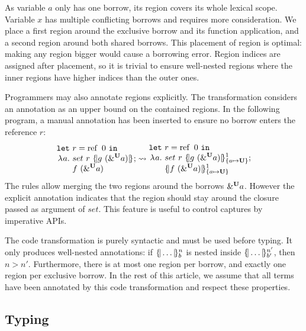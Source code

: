 %
As variable $a$ only has one borrow, its region covers its whole lexical scope.
Variable $x$ has multiple conflicting borrows and requires more consideration.
We place a first
region around the exclusive borrow and its function application,
and a second region around both shared borrows. This placement of region
is optimal: making any region bigger would cause a borrowing
error.
Region indices are assigned after placement, so it is trivial to
ensure well-nested regions where the inner regions have
higher indices than the outer ones.

Programmers may also annotate regions explicitly.
The transformation considers an annotation as an
upper bound on the contained regions.
In the following program, a manual annotation has been inserted to ensure
no borrow enters the reference $r$:
%
\[
  \setlength{\jot}{-1pt}
  \RannotT{
\begin{aligned}
  \letin{&r}{\operatorname{ref}\ 0}{}\\
  \lam{a}{}\ &
  set\ r\ \region[]{}{g\ (\borrow[\kun]{a})};\\
  &f\ (\borrow[\kun]{a})
\end{aligned}
}{
\begin{aligned}
  \letin{&r}{\operatorname{ref}\ 0}{}\\
  \lam{a}{}\ &
  set\ r\ \region[1]{\Sone a\IBORROW}{g\ (\borrow[\kun]{a})};\\
  &\region[1]{\Sone a\IBORROW}{f\ (\borrow[\kun]{a})}
\end{aligned}
}
\]
%
The rules allow merging the two regions around the borrows
$\borrow[\kun]{a}$. However
the explicit annotation indicates that the region should stay around the closure
passed as argument of $set$. This feature is useful to control captures
by imperative APIs.

The code transformation is purely syntactic and must be used before
typing. It only produces well-nested annotations: if $\region[n]{b}{\dots}$
is nested inside $\region[n']{b'}{\dots}$, then $n > n'$. Furthermore, there
is at most one region per borrow, and exactly one region per exclusive borrow.
In the rest of this article, we assume
that all terms have been annotated by this code transformation and respect
these properties.

\subsection{Typing}
\label{sdtyping}


